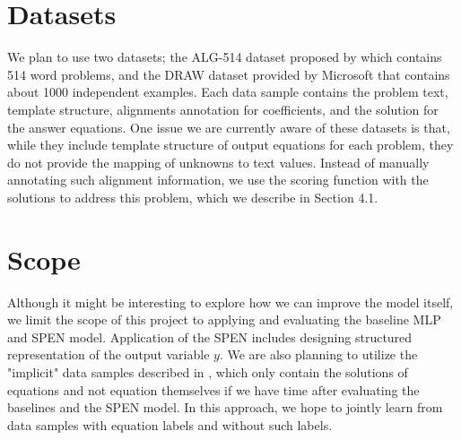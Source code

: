 \documentclass[11pt,letterpaper]{article}
\begin{document}
\section{Datasets}
We plan to use two datasets; the ALG-514 dataset proposed by \cite{Kushman2014LearningTA} which contains 514 word problems, and the DRAW dataset provided by Microsoft that contains about 1000 independent examples. Each data sample contains the problem text, template structure, alignments annotation for coefficients, and the solution for the answer equations. One issue we are currently aware of these datasets is that, while they include template structure of output equations for each problem, they do not provide the mapping of unknowns to text values. Instead of manually annotating such alignment information, we use the scoring function with the solutions to address this problem, which we describe in Section 4.1. %
\section{Scope}
Although it might be interesting to explore how we can improve the model itself, we limit the scope of this project to applying and evaluating the baseline MLP and SPEN model. Application of the SPEN includes designing structured representation of the output variable $y$. We are also planning to utilize the "implicit" data samples described in \cite{UpChChYi16}, which only contain the solutions of equations and not equation themselves if we have time after evaluating the baselines and the SPEN model. In this approach, we hope to jointly learn from data samples with equation labels and without such labels.
\fi
%
\nocite{*}


\end{document}
